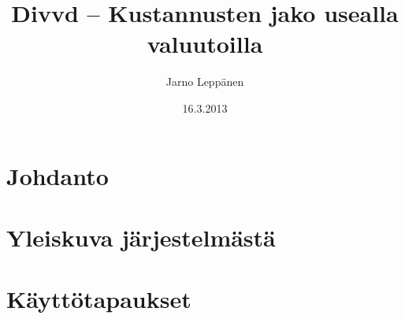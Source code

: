 \documentclass[a4paper,parskip=half]{scrartcl}
\author{Jarno Leppänen}
\title{Divvd -- Kustannusten jako usealla valuutoilla}
\date{16.3.2013}
\begin{document}
\maketitle

\section{Johdanto}
\section{Yleiskuva järjestelmästä}
\section{Käyttötapaukset}



\end{document}
